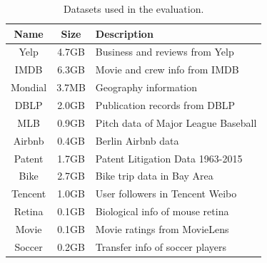 \documentclass[]{article}
\begin{document}
                \begin{table}
                    \centering
                    \small
                    \begin{tabular}{|c|c|l|}
                    \hline
                    \textbf{Name} & \textbf{Size} & \textbf{Description} \\
                    \hline
                    Yelp & 4.7GB & Business and reviews from Yelp \\
                    \hline
                    IMDB & 6.3GB & Movie and crew info from IMDB \\
                    \hline
                    Mondial & 3.7MB & Geography information \\
                    \hline
                    DBLP & 2.0GB & Publication records from DBLP \\
                    \hline
                    MLB & 0.9GB & Pitch data of Major League Baseball \\
                    \hline
                    Airbnb & 0.4GB & Berlin Airbnb data \\
                    \hline
                    Patent & 1.7GB & Patent Litigation Data 1963-2015 \\
                    \hline
                    Bike & 2.7GB & Bike trip data in Bay Area \\
                    \hline
                    Tencent & 1.0GB & User followers in Tencent Weibo \\
                    \hline
                    Retina & 0.1GB & Biological info of mouse retina \\
                    \hline
                    Movie & 0.1GB & Movie ratings from MovieLens \\
                    \hline
                    Soccer & 0.2GB & Transfer info of soccer players \\
                    \hline
                    \end{tabular}
                    \vspace{5pt}
                    \caption{Datasets used in the evaluation.}
                    \label{tab:datasets}
                    \vspace{-15pt}
                \end{table}
\end{document}
